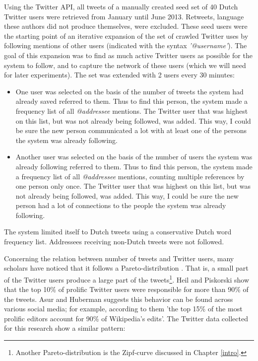 \documentclass[11pt]{article}
\begin{document}
Using the Twitter API, all tweets of a manually created seed set of 40 Dutch Twitter users were retrieved from January until June 2013. Retweets, language these authors did not produce themselves, were excluded. These seed users were the starting point of an iterative expansion of the set of crawled Twitter uses by following mentions of other users (indicated with the syntax \emph{'@username'}). The goal of this expansion was to find as much active Twitter users as possible for the system to follow, and to capture the network of these users (which we will need for later experiments). The set was extended with 2 users every 30 minutes:

\begin{itemize}
\item One user was selected on the basis of the number of tweets the system had already saved referred to them. Thus to find this person, the system made a frequency list of all \emph{@addressee} mentions. The Twitter user that was highest on this list, but was not already being followed, was added. This way, I could be sure the new person communicated a lot with at least one of the persons the system was already following.
\item Another user was selected on the basis of the number of users the system was already following referred to them. Thus to find this person, the system made a frequency list of all \emph{@addressee} mentions, counting multiple references by one person only once. The Twitter user that was highest on this list, but was not already being followed, was added. This way, I could be sure the new person had a lot of connections to the people the system was already following.
\end{itemize}

The system limited itself to Dutch tweets using a conservative Dutch word frequency list. Addressees receiving non-Dutch tweets were not followed.

Concerning the relation between number of tweets and Twitter users, many scholars have noticed that it follows a Pareto-distribution \cite{asur+10,rui+12}. That is, a small part of the Twitter users produce a large part of the tweets\footnote{Another Pareto-distribution is the Zipf-curve discussed in Chapter \ref{intro}.}. Heil and Piskorski  show that the top 10\% of prolific Twitter users were responsible for more than 90\% of the tweets. Asur and Huberman  suggests this behavior can be found across various social media; for example, according to them 'the top 15\% of the most prolific editors account for 90\% of Wikipedia's edits'. The Twitter data collected for this research show a similar pattern:
\end{document}

